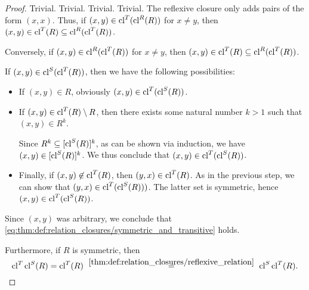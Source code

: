 \begin{proof}
   Trivial.
   Trivial.
   Trivial.
   Trivial.
   The reflexive closure only adds pairs of the form \( (x, x) \). Thus, if \( (x, y) \in \operatorname{cl}^T(\operatorname{cl}^R(R)) \) for \( x \neq y \), then \( (x, y) \in \operatorname{cl}^T(R) \subseteq \operatorname{cl}^R(\operatorname{cl}^T(R)) \).

  Conversely, if \( (x, y) \in \operatorname{cl}^R(\operatorname{cl}^T(R)) \) for \( x \neq y \), then \( (x, y) \in \operatorname{cl}^T(R) \subseteq \operatorname{cl}^R(\operatorname{cl}^T(R)) \).

   If \( (x, y) \in \operatorname{cl}^S(\operatorname{cl}^T(R)) \), then we have the following possibilities:
  \begin{itemize}
    \item If \( (x, y) \in R \), obviously \( (x, y) \in \operatorname{cl}^T(\operatorname{cl}^S(R)) \).
    \item If \( (x, y) \in \operatorname{cl}^T(R) \setminus R \), then there exists some natural number \( k > 1 \) such that \( (x, y) \in R^k \).

    Since \( R^k \subseteq [\operatorname{cl}^S(R)]^k \), as can be shown via induction, we have \( (x, y) \in [\operatorname{cl}^S(R)]^k \). We thus conclude that \( (x, y) \in \operatorname{cl}^T(\operatorname{cl}^S(R)) \).

    \item Finally, if \( (x, y) \not\in \operatorname{cl}^T(R) \), then \( (y, x) \in \operatorname{cl}^T(R) \). As in the previous step, we can show that \( (y, x) \in \operatorname{cl}^T(\operatorname{cl}^S(R))) \). The latter set is symmetric, hence \( (x, y) \in \operatorname{cl}^T(\operatorname{cl}^S(R)) \).
  \end{itemize}

  Since \( (x, y) \) was arbitrary, we conclude that \eqref{eq:thm:def:relation_closures/symmetric_and_transitive} holds.

  Furthermore, if \( R \) is symmetric, then
  \begin{equation*}
    \cl^T \cl^S(R)
    =
    \cl^T(R)
    \reloset {\ref{thm:def:relation_closures/reflexive_relation}} =
    \cl^S \cl^T(R).
  \end{equation*}
\end{proof}

